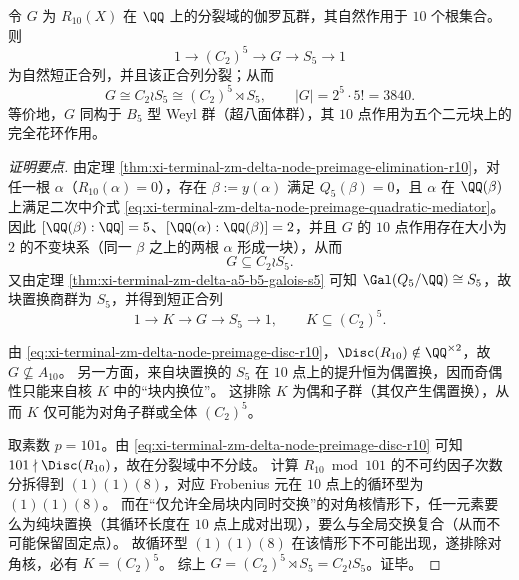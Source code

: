 \begin{theorem}[节点预像十次层的花环积伽罗瓦对称]\label{thm:xi-terminal-zm-delta-node-preimage-galois-wreath}
令 \(G\) 为 \(R_{10}(X)\) 在 \(\QQ\) 上的分裂域的伽罗瓦群，其自然作用于 \(10\) 个根集合。
则
\[
1\longrightarrow (C_2)^5\longrightarrow G\longrightarrow S_5\longrightarrow 1
\]
为自然短正合列，并且该正合列分裂；从而
\[
G\cong C_2\wr S_5\cong (C_2)^{5}\rtimes S_5,
\qquad
|G|=2^{5}\cdot 5!=3840.
\]
等价地，\(G\) 同构于 \(B_5\) 型 Weyl 群（超八面体群），其 \(10\) 点作用为五个二元块上的完全花环作用。
\end{theorem}

\begin{proof}[证明要点]
由定理 \ref{thm:xi-terminal-zm-delta-node-preimage-elimination-r10}，对任一根 \(\alpha\)（\(R_{10}(\alpha)=0\)），存在 \(\beta:=y(\alpha)\) 满足 \(Q_5(\beta)=0\)，且 \(\alpha\) 在 \(\QQ(\beta)\) 上满足二次中介式 \eqref{eq:xi-terminal-zm-delta-node-preimage-quadratic-mediator}。
因此 \([\QQ(\beta):\QQ]=5\)、\([\QQ(\alpha):\QQ(\beta)]=2\)，并且 \(G\) 的 \(10\) 点作用存在大小为 \(2\) 的不变块系（同一 \(\beta\) 之上的两根 \(\alpha\) 形成一块），从而
\[
G\subseteq C_2\wr S_5.
\]
又由定理 \ref{thm:xi-terminal-zm-delta-a5-b5-galois-s5} 可知 \(\Gal(Q_5/\QQ)\cong S_5\)，故块置换商群为 \(S_5\)，并得到短正合列
\[
1\longrightarrow K\longrightarrow G\longrightarrow S_5\longrightarrow 1,
\qquad
K\subseteq (C_2)^5.
\]
\par
由 \eqref{eq:xi-terminal-zm-delta-node-preimage-disc-r10}，\(\Disc(R_{10})\notin\QQ^{\times 2}\)，故 \(G\nsubseteq A_{10}\)。
另一方面，来自块置换的 \(S_5\) 在 \(10\) 点上的提升恒为偶置换，因而奇偶性只能来自核 \(K\) 中的“块内换位”。
这排除 \(K\) 为偶和子群（其仅产生偶置换），从而 \(K\) 仅可能为对角子群或全体 \((C_2)^5\)。
\par
取素数 \(p=101\)。由 \eqref{eq:xi-terminal-zm-delta-node-preimage-disc-r10} 可知 \(101\nmid\Disc(R_{10})\)，故在分裂域中不分歧。
计算 \(R_{10}\bmod 101\) 的不可约因子次数分拆得到 \((1)(1)(8)\)，对应 Frobenius 元在 \(10\) 点上的循环型为 \((1)(1)(8)\)。
而在“仅允许全局块内同时交换”的对角核情形下，任一元素要么为纯块置换（其循环长度在 \(10\) 点上成对出现），要么与全局交换复合（从而不可能保留固定点）。
故循环型 \((1)(1)(8)\) 在该情形下不可能出现，遂排除对角核，必有 \(K=(C_2)^5\)。
综上 \(G=(C_2)^5\rtimes S_5=C_2\wr S_5\)。证毕。
\end{proof}

